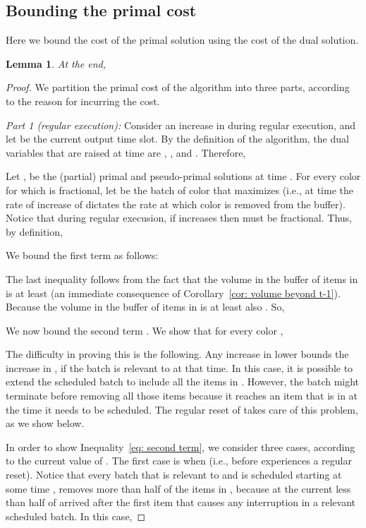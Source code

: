 \documentclass[12pt]{article}
\newtheorem{lemma}[theorem]{Lemma}
\begin{document}
\subsection{Bounding the primal cost}

Here we bound the cost of the primal solution using the
cost of the dual solution.
\begin{lemma}\label{lm: primal cost}
At the end, 

\end{lemma}

\begin{proof}
We partition the primal cost of the algorithm into three parts,
according to the reason for incurring the cost.

{\em Part 1 (regular execution):}\/
Consider an increase  in  during regular
execution, and let  be the current output time slot.
By the definition of the algorithm, the dual variables that 
are raised at time  
are , , and
. Therefore,

Let ,  be the (partial) primal and pseudo-primal 
solutions at time .
For every color  for which  is
fractional, let  be the batch of color 
that maximizes  (i.e., at time
 the rate of increase of  dictates the
rate at which color  is removed from the buffer).
Notice that during regular execusion, if  increases
then  must be fractional. 
Thus, by definition,

We bound the first term as follows:

The last inequality follows from the fact that the volume in the buffer
of items in  is at least  (an immediate
consequence of Corollary~\ref{cor: volume beyond t-1}).
Because the volume in the buffer of items in  
is at least 
also . So,


We now bound the second term
.
We show that for every color ,

The difficulty in proving this is the following. Any increase in
 lower bounds the increase in , if
the batch  is relevant to  at that time. In this
case, it is possible to extend the scheduled batch  to
include all the items in . However, the batch
might terminate before removing all those items because it
reaches an item that is in  at the time it needs to
be scheduled. The regular reset of  takes
care of this problem, as we show below.

In order to show Inequality~\eqref{eq: second term}, we consider 
three cases, according to the current value of . The first case 
is when  (i.e., before 
experiences a regular reset). Notice that every batch  that 
is relevant to  and is scheduled starting at some time
, removes more than half of the items in ,
because at the current  less than half of  arrived 
after the first item  that causes any interruption 
in a relevant scheduled batch. In this case,



\end{proof}
\end{document}
